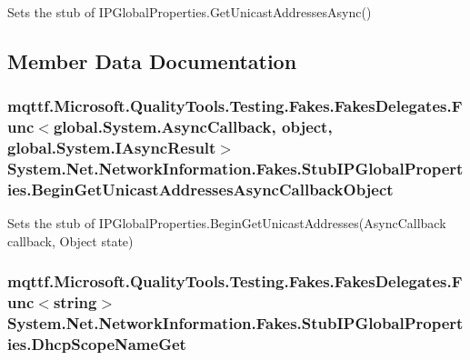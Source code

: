 Sets the stub of I\-P\-Global\-Properties.\-Get\-Unicast\-Addresses\-Async()



\subsection{Member Data Documentation}
\hypertarget{class_system_1_1_net_1_1_network_information_1_1_fakes_1_1_stub_i_p_global_properties_a58cc4a7359fd285ceeff7da5b06cf615}{
\subsubsection[{Begin\-Get\-Unicast\-Addresses\-Async\-Callback\-Object}]{\setlength{\rightskip}{0pt plus 5cm}mqttf.\-Microsoft.\-Quality\-Tools.\-Testing.\-Fakes.\-Fakes\-Delegates.\-Func$<$global.\-System.\-Async\-Callback, object, global.\-System.\-I\-Async\-Result$>$ System.\-Net.\-Network\-Information.\-Fakes.\-Stub\-I\-P\-Global\-Properties.\-Begin\-Get\-Unicast\-Addresses\-Async\-Callback\-Object}}\label{class_system_1_1_net_1_1_network_information_1_1_fakes_1_1_stub_i_p_global_properties_a58cc4a7359fd285ceeff7da5b06cf615}


Sets the stub of I\-P\-Global\-Properties.\-Begin\-Get\-Unicast\-Addresses(\-Async\-Callback callback, Object state)

\hypertarget{class_system_1_1_net_1_1_network_information_1_1_fakes_1_1_stub_i_p_global_properties_a60526d58362cb3acfeb9065564fa7389}{
\subsubsection[{Dhcp\-Scope\-Name\-Get}]{\setlength{\rightskip}{0pt plus 5cm}mqttf.\-Microsoft.\-Quality\-Tools.\-Testing.\-Fakes.\-Fakes\-Delegates.\-Func$<$string$>$ System.\-Net.\-Network\-Information.\-Fakes.\-Stub\-I\-P\-Global\-Properties.\-Dhcp\-Scope\-Name\-Get}}\label{class_system_1_1_net_1_1_network_information_1_1_fakes_1_1_stub_i_p_global_properties_a60526d58362cb3acfeb9065564fa7389}


